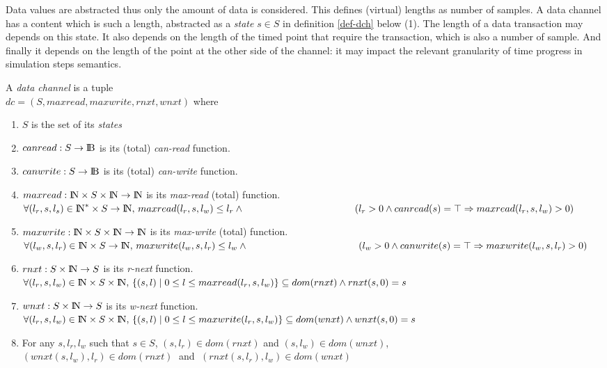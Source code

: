 \documentclass{article}
\newcommand{\NAT}{\mbox{\normalfont I$\!$N}}
\newcommand{\BOOL}{\mbox{\normalfont I$\!$B}}
\begin{document}
Data values are abstracted thus only the amount of data is considered. This defines (virtual) lengths as number of samples. A data channel has a content which is such a length, abstracted as a {\em state} $s\in S$ in definition \ref{def-dch} below (1). The length of a data transaction may depends on this state. It also depends on the length of the timed point that require the transaction, which is also a number of sample. And finally it depends on the length of the point at the other side of the channel: it may impact the relevant granularity of time progress in simulation steps semantics.
\begin{definition}\label{def-dch} A {\em data channel} is a tuple\\
$dc=(S,maxread,maxwrite,rnxt,wnxt)$ where
\begin{enumerate}
\item $S$ is the set of its {\em states}
\item $canread:S\rightarrow\BOOL$ is its (total) {\em can-read} function.
\item $canwrite:S\rightarrow\BOOL$ is its (total) {\em can-write} function.
\item $maxread:\NAT\times S\times \NAT\rightarrow\NAT$ is its {\em max-read} (total) function.\\
      $\forall (l_r,s,l_s)\in\NAT^*\times S\rightarrow\NAT,\, maxread(l_r,s,l_w)\leq l_r \wedge\\
			\hspace*{4cm}(l_r>0\wedge canread(s)=\top \Rightarrow maxread(l_r,s,l_w)>0)$
\item $maxwrite:\NAT\times S\times\NAT\rightarrow\NAT$ is its {\em max-write} (total) function.\\
      $\forall (l_w,s,l_r)\in\NAT\times S\rightarrow\NAT,\, maxwrite(l_w,s,l_r)\leq l_w \wedge\\ 
			\hspace*{4cm}(l_w>0 \wedge canwrite(s)=\top \Rightarrow maxwrite(l_w,s,l_r)>0)$
\item $rnxt:S\times\NAT\rightarrow S$ is its {\em r-next} function.\\
      $\forall (l_r,s,l_w)\in\NAT\times S\times\NAT,\,\{(s,l)\mid 0\leq l\leq maxread(l_r,s,l_w)\}\subseteq dom(rnxt) \wedge rnxt(s,0)=s$
\item $wnxt:S\times\NAT\rightarrow S$ is its {\em w-next} function.\\
      $\forall (l_r,s,l_w)\in\NAT\times S\times\NAT,\,\{(s,l)\mid 0\leq l\leq maxwrite(l_r,s,l_w)\}\subseteq dom(wnxt) \wedge wnxt(s,0)=s$
\item For any $s,l_r,l_w$ such that $s\in S$, $(s,l_r) \in dom(rnxt)$ and $(s,l_w)\in dom(wnxt)$,\\
      $(wnxt(s,l_w),l_r)\in dom(rnxt)\;$ and $\;(rnxt(s,l_r),l_w)\in dom(wnxt)$  
\end{enumerate}
\end{definition}
\end{document}
